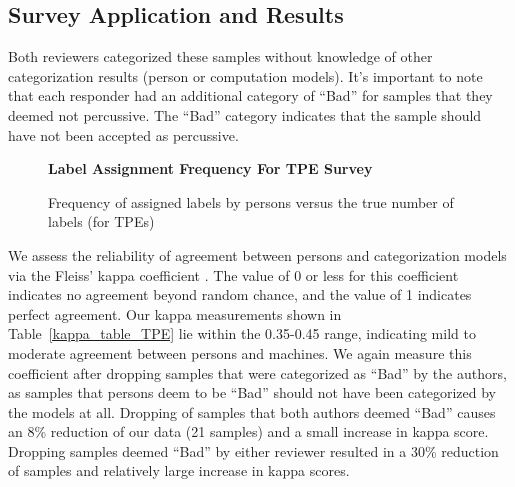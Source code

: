 \documentclass[\main/thesis.tex]{subfiles}
\begin{document}
 \subsection{Survey Application and Results}
Both reviewers categorized these samples without knowledge of other categorization results (person or computation models). It's important to note that each responder had an additional category of \enquote{Bad} for samples that they deemed not percussive. The \enquote{Bad} category indicates that the sample should have not been accepted as percussive.

\begin{figure}[h!]
    \begin{center}
    \textbf{Label Assignment Frequency For TPE Survey}
    \end{center}
    \caption{Frequency of assigned labels by persons versus the true number of labels (for TPEs)}
\label{fig:freq-survey-2p}
\end{figure}
We assess the reliability of agreement between persons and categorization models via the Fleiss' kappa coefficient \cite{fleiss1971measuring}. The value of 0 or less for this coefficient indicates no agreement beyond random chance, and the value of 1 indicates perfect agreement. Our kappa measurements shown in Table~\ref{kappa_table_TPE} lie within the 0.35-0.45 range, indicating mild to moderate agreement between persons and machines. We again measure this coefficient after dropping samples that were categorized as \enquote{Bad} by the authors, as samples that persons deem to be \enquote{Bad} should not have been categorized by the models at all. Dropping of samples that both authors deemed \enquote{Bad} causes an 8\% reduction of our data (21 samples) and a small increase in kappa score. Dropping samples deemed \enquote{Bad} by either reviewer resulted in a 30\% reduction of samples and relatively large increase in kappa scores. 
\end{document}
